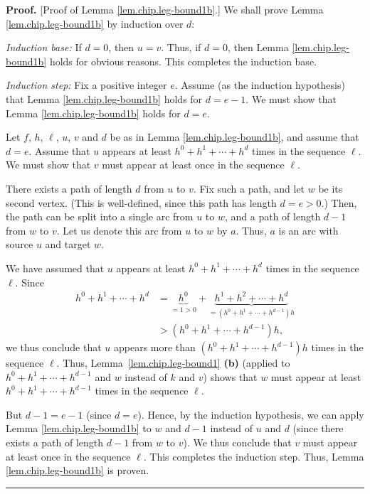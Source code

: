 \documentclass[numbers=enddot,12pt,final,onecolumn,notitlepage]{scrartcl}%
\theoremstyle{definition}
\newenvironment{proof}[1][Proof]{\noindent\textbf{#1.} }{\ \rule{0.5em}{0.5em}}
\begin{document}
\begin{proof}
[Proof of Lemma \ref{lem.chip.leg-bound1b}.] We shall prove Lemma
\ref{lem.chip.leg-bound1b} by induction over $d$:

\textit{Induction base:} If $d=0$, then $u=v$. Thus, if $d=0$, then Lemma
\ref{lem.chip.leg-bound1b} holds for obvious reasons. This completes the
induction base.

\textit{Induction step:} Fix a positive integer $e$. Assume (as the induction
hypothesis) that Lemma \ref{lem.chip.leg-bound1b} holds for $d=e-1$. We must
show that Lemma \ref{lem.chip.leg-bound1b} holds for $d=e$.

Let $f$, $h$, $\ell$, $u$, $v$ and $d$ be as in Lemma
\ref{lem.chip.leg-bound1b}, and assume that $d=e$. Assume that $u$ appears at
least $h^{0}+h^{1}+\cdots+h^{d}$ times in the sequence $\ell$. We must show
that $v$ must appear at least once in the sequence $\ell$.

There exists a path of length $d$ from $u$ to $v$. Fix such a path, and let
$w$ be its second vertex. (This is well-defined, since this path has length
$d=e>0$.) Then, the path can be split into a single arc from $u$ to $w$, and a
path of length $d-1$ from $w$ to $v$. Let us denote this arc from $u$ to $w$
by $a$. Thus, $a$ is an arc with source $u$ and target $w$.

We have assumed that $u$ appears at least $h^{0}+h^{1}+\cdots+h^{d}$ times in
the sequence $\ell$. Since%
\begin{align*}
h^{0}+h^{1}+\cdots+h^{d}  & =\underbrace{h^{0}}_{=1>0}+\underbrace{h^{1}%
+h^{2}+\cdots+h^{d}}_{=\left(  h^{0}+h^{1}+\cdots+h^{d-1}\right)  h}\\
& >\left(  h^{0}+h^{1}+\cdots+h^{d-1}\right)  h,
\end{align*}
we thus conclude that $u$ appears more than $\left(  h^{0}+h^{1}%
+\cdots+h^{d-1}\right)  h$ times in the sequence $\ell$. Thus,
Lemma~\ref{lem.chip.leg-bound1} \textbf{(b)} (applied to $h^{0}+h^{1}%
+\cdots+h^{d-1}$ and $w$ instead of $k$ and $v$) shows that $w$ must appear at
least $h^{0}+h^{1}+\cdots+h^{d-1}$ times in the sequence $\ell$.

But $d-1=e-1$ (since $d=e$). Hence, by the induction hypothesis, we can apply
Lemma \ref{lem.chip.leg-bound1b} to $w$ and $d-1$ instead of $u$ and $d$
(since there exists a path of length $d-1$ from $w$ to $v$). We thus conclude
that $v$ must appear at least once in the sequence $\ell$. This completes the
induction step. Thus, Lemma \ref{lem.chip.leg-bound1b} is proven.
\end{proof}
\end{document}
